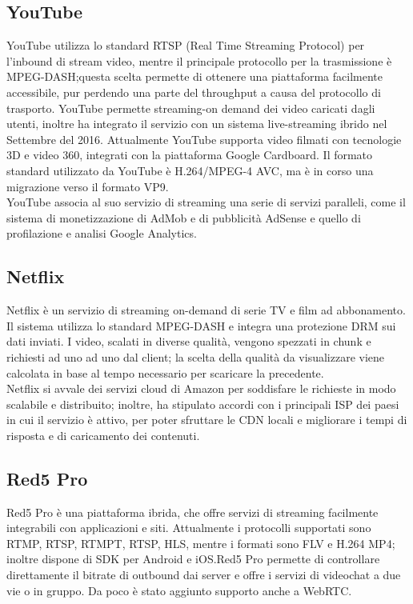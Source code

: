 	\subsection{YouTube}
	YouTube utilizza lo standard RTSP (Real Time Streaming Protocol) per l'inbound di stream video, mentre il principale protocollo per la trasmissione è MPEG-DASH;\@ questa scelta permette di ottenere una piattaforma facilmente accessibile, pur perdendo una parte del throughput a causa del protocollo di trasporto. YouTube permette streaming-on demand dei video caricati dagli utenti, inoltre ha integrato il servizio con un sistema live-streaming ibrido nel Settembre del 2016. Attualmente YouTube supporta video filmati con tecnologie 3D e video 360\textdegree, integrati con la piattaforma Google Cardboard. Il formato standard utilizzato da YouTube è H.264/MPEG-4 AVC, ma è in corso una migrazione verso il formato VP9.
	\\
	YouTube associa al suo servizio di streaming una serie di servizi paralleli, come il sistema di monetizzazione di AdMob e di pubblicità AdSense e quello di profilazione e analisi Google Analytics.

	\subsection{Netflix}
	Netflix è un servizio di streaming on-demand di serie TV e film ad abbonamento. Il sistema utilizza lo standard MPEG-DASH e integra una protezione DRM sui dati inviati. I video, scalati in diverse qualità, vengono spezzati in chunk e richiesti ad uno ad uno dal client; la scelta della qualità da visualizzare viene calcolata in base al tempo necessario per scaricare la precedente.
	\\
	Netflix si avvale dei servizi cloud di Amazon per soddisfare le richieste in modo scalabile e distribuito; inoltre, ha stipulato accordi con i principali \gls{ISP} dei paesi in cui il servizio è attivo, per poter sfruttare le \gls{CDN} locali e migliorare i tempi di risposta e di caricamento dei contenuti.

	\subsection{Red5 Pro}
	Red5 Pro è una piattaforma ibrida, che offre servizi di streaming facilmente integrabili con applicazioni e siti. Attualmente i protocolli supportati sono RTMP, RTSP, RTMPT, RTSP, HLS, mentre i formati sono FLV e H.264 MP4; inoltre dispone di SDK per Android e iOS.\@ Red5 Pro permette di controllare direttamente il bitrate di outbound dai server e offre i servizi di videochat a due vie o in gruppo. Da poco è stato aggiunto supporto anche a WebRTC.\@

